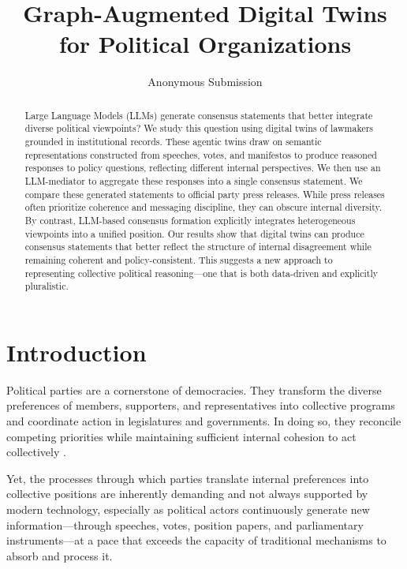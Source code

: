 \documentclass[letterpaper]{article}
\title{Graph-Augmented Digital Twins for Political Organizations}
\author{Anonymous Submission}
\begin{document}
\maketitle

\begin{abstract}
\noindent 
Large Language Models (LLMs) generate consensus statements that better integrate diverse political viewpoints? We study this question using digital twins of lawmakers grounded in institutional records. These agentic twins draw on semantic representations constructed from speeches, votes, and manifestos to produce reasoned responses to policy questions, reflecting different internal perspectives. We then use an LLM-mediator to aggregate these responses into a single consensus statement. We compare these generated statements to official party press releases. While press releases often prioritize coherence and messaging discipline, they can obscure internal diversity. By contrast, LLM-based consensus formation explicitly integrates heterogeneous viewpoints into a unified position.
Our results show that digital twins can produce consensus statements that better reflect the structure of internal disagreement while remaining coherent and policy-consistent. This suggests a new approach to representing collective political reasoning—one that is both data-driven and explicitly pluralistic.

\end{abstract}

\clearpage

\section{Introduction}

Political parties are a cornerstone of democracies. They transform the diverse preferences of members, supporters, and representatives into collective programs and coordinate action in legislatures and governments. In doing so, they reconcile competing priorities while maintaining sufficient internal cohesion to act collectively \citep{dalton2011political}.

Yet, the processes through which parties translate internal preferences into collective positions are inherently demanding and not always supported by modern technology, especially as political actors continuously generate new information—through speeches, votes, position papers, and parliamentary instruments—at a pace that exceeds the capacity of traditional mechanisms to absorb and process it.
\end{document}
